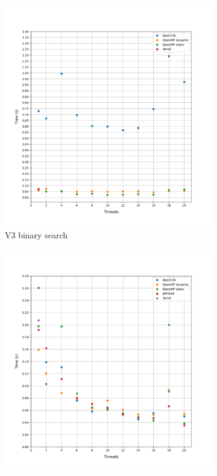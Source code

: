 \documentclass[12pt, a4paper]{article}
\begin{document}
\begin{figure}[h!]
     \begin{subfigure}[b]{0.33\textwidth}
         \centering
         \includegraphics[height=.4\textheight, width=\textwidth, keepaspectratio]{assets/dblp/v3.png}
    \caption{V3 binary search}
     \end{subfigure}
     \hfill
     \begin{subfigure}[b]{0.33\textwidth}
         \centering
         \includegraphics[height=.4\textheight, width=\textwidth, keepaspectratio]{assets/dblp/v4_binary.png}

\end{subfigure}
\end{figure}
\end{document}
